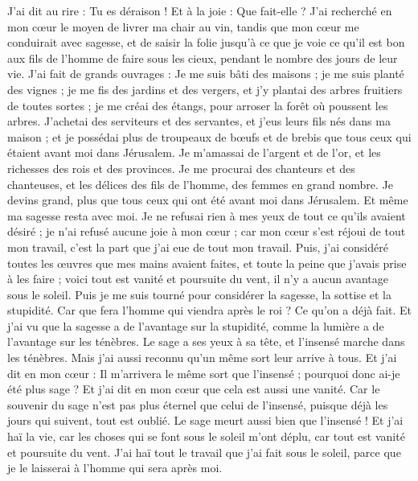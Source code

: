 \begin{multicols}{2}
J'ai dit au rire : Tu es déraison ! Et à la joie : Que fait-elle ?
J'ai recherché en mon cœur le moyen de livrer ma chair au vin, tandis que mon cœur me conduirait avec sagesse, et de saisir la folie jusqu’à ce que je voie ce qu'il est bon aux fils de l’homme de faire sous les cieux, pendant le nombre des jours de leur vie.
J’ai fait de grands ouvrages : Je me suis bâti des maisons ; je me suis planté des vignes ;
je me fis des jardins et des vergers, et j'y plantai des arbres fruitiers de toutes sortes ;
je me créai des étangs, pour arroser la forêt où poussent les arbres.
J’achetai des serviteurs et des servantes, et j'eus leurs fils nés dans ma maison ; et je possédai plus de troupeaux de bœufs et de brebis que tous ceux qui étaient avant moi dans Jérusalem.
Je m’amassai de l'argent et de l'or, et les richesses des rois et des provinces. Je me procurai des chanteurs et des chanteuses, et les délices des fils de l’homme, des femmes en grand nombre.
Je devins grand, plus que tous ceux qui ont été avant moi dans Jérusalem. Et même ma sagesse resta avec moi.
Je ne refusai rien à mes yeux de tout ce qu'ils avaient désiré ; je n'ai refusé aucune joie à mon cœur ; car mon cœur s'est réjoui de tout mon travail, c'est la part que j'ai eue de tout mon travail.
Puis, j’ai considéré toutes les œuvres que mes mains avaient faites, et toute la peine que j’avais prise à les faire ; voici tout est vanité et poursuite du vent, il n’y a aucun avantage sous le soleil.
Puis je me suis tourné pour considérer la sagesse, la sottise et la stupidité. Car que fera l’homme qui viendra après le roi ? Ce qu’on a déjà fait.
Et j'ai vu que la sagesse a de l’avantage sur la stupidité, comme la lumière a de l’avantage sur les ténèbres.
Le sage a ses yeux à sa tête, et l’insensé marche dans les ténèbres. Mais j'ai aussi reconnu qu'un même sort leur arrive à tous.
Et j'ai dit en mon cœur : Il m'arrivera le même sort que l’insensé ; pourquoi donc ai-je été plus sage ? Et j'ai dit en mon cœur que cela est aussi une vanité.
Car le souvenir du sage n’est pas plus éternel que celui de l’insensé, puisque déjà les jours qui suivent, tout est oublié. Le sage meurt aussi bien que l’insensé !
Et j'ai haï la vie, car les choses qui se font sous le soleil m'ont déplu, car tout est vanité et poursuite du vent.
J'ai haï tout le travail que j’ai fait sous le soleil, parce que je le laisserai à l'homme qui sera après moi.

\end{multicols}
